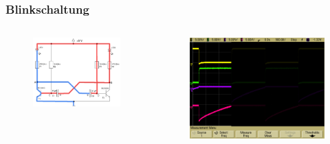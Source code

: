 \begin{frame}
\begin{columns}[c]
    \end{columns}
\end{frame}

\begin{frame}
    \frametitle{Blinkschaltung}
    \begin{columns}[c]
        \begin{figure}[H]
        \begin{center}
                \includegraphics[scale=0.25]{./img/schaltungen/blink_2.png}
        \end{center}
        \end{figure}
    \begin{figure}[H]
    \begin{center}
            \includegraphics[scale=0.12]{./img/oszi/blink_shade_1.png}

\end{center}
\end{figure}
\end{columns}
\end{frame}
